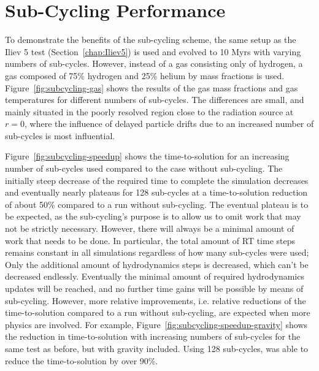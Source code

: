\section{Sub-Cycling Performance}\label{chap:subcycling-results}


To demonstrate the benefits of the sub-cycling scheme, the same setup as the Iliev 5 test
(Section~\ref{chap:Iliev5}) is used and evolved to 10 Myrs with varying numbers of sub-cycles.
However, instead of a gas consisting only of hydrogen, a gas composed of  75\% hydrogen and 25\%
helium by mass fractions is used. Figure~\ref{fig:subcycling-gas} shows the results of the gas mass
fractions and gas temperatures for different numbers of sub-cycles. The differences are small, and
mainly situated in the poorly resolved region close to the radiation source at $r = 0$, where the
influence of delayed particle drifts due to an increased number of sub-cycles is most influential.

Figure~\ref{fig:subcycling-speedup} shows the time-to-solution for an increasing number of
sub-cycles used compared to the case without sub-cycling. The initially steep decrease of the
required time to complete the simulation decreases and eventually nearly plateaus for 128 sub-cycles
at a time-to-solution reduction of about 50\% compared to a run without sub-cycling. The eventual
plateau is to be expected, as the sub-cycling's purpose is to allow us to omit work that may not be
strictly necessary. However, there will always be a minimal amount of work that needs to be done. In
particular, the total amount of RT time steps remains constant in all simulations regardless of how
many sub-cycles were used; Only the additional amount of hydrodynamics steps is decreased, which
can't be decreased endlessly. Eventually the minimal amount of required hydrodynamics updates will
be reached, and no further time gains will be possible by means of sub-cycling. However, more
relative improvements, i.e. relative reductions of the time-to-solution compared to a run without
sub-cycling, are expected when more physics are involved. For example,
Figure~\ref{fig:subcycling-speedup-gravity} shows the reduction in time-to-solution with increasing
numbers of sub-cycles for the same test as before, but with gravity included. Using 128 sub-cycles,
\GEARRT was able to reduce the time-to-solution by over 90\%.






